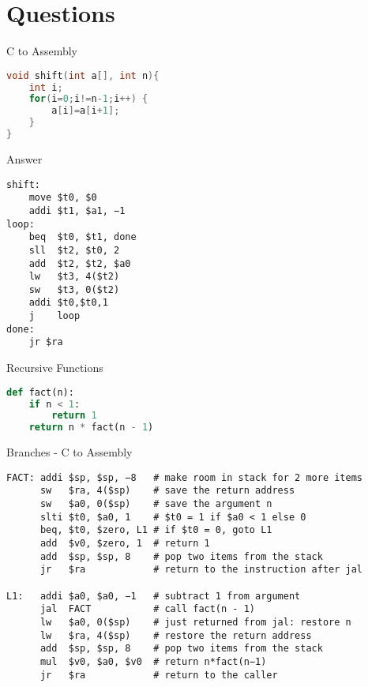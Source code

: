 \section{Questions}
\begin{frame}[fragile]{C to Assembly}
\begin{lstlisting}[language=c, keywordstyle=\color{purple}\textbf]
void shift(int a[], int n){
    int i;
    for(i=0;i!=n-1;i++) {
        a[i]=a[i+1];
    }
}
\end{lstlisting}

\end{frame}

\begin{frame}[fragile]{Answer}
\begin{lstlisting}[keywordstyle=\color{purple}\textbf, keywords={move, addi, beq, sll, add, lw, sw, j, jr}]
shift:
    move $t0, $0
    addi $t1, $a1, −1
loop:
    beq  $t0, $t1, done
    sll  $t2, $t0, 2
    add  $t2, $t2, $a0
    lw   $t3, 4($t2)
    sw   $t3, 0($t2)
    addi $t0,$t0,1
    j    loop
done:
    jr $ra
\end{lstlisting}
\end{frame}

\begin{frame}[fragile]{Recursive Functions}
\begin{lstlisting}[keywordstyle=\color{purple}\textbf, language=python]
def fact(n):
    if n < 1:
        return 1
    return n * fact(n - 1)
\end{lstlisting}    
\end{frame}

\begin{frame}[fragile]{Branches - C to Assembly}
\begin{lstlisting}[keywords={addi, sw, add, slti, beq, mul, jr, jal, lw}, keywordstyle=\color{purple}\textbf]
FACT: addi $sp, $sp, −8   # make room in stack for 2 more items
      sw   $ra, 4($sp)    # save the return address
      sw   $a0, 0($sp)    # save the argument n
      slti $t0, $a0, 1    # $t0 = 1 if $a0 < 1 else 0
      beq, $t0, $zero, L1 # if $t0 = 0, goto L1
      add  $v0, $zero, 1  # return 1
      add  $sp, $sp, 8    # pop two items from the stack
      jr   $ra            # return to the instruction after jal
    
L1:   addi $a0, $a0, −1   # subtract 1 from argument
      jal  FACT           # call fact(n - 1)
      lw   $a0, 0($sp)    # just returned from jal: restore n
      lw   $ra, 4($sp)    # restore the return address
      add  $sp, $sp, 8    # pop two items from the stack
      mul  $v0, $a0, $v0  # return n*fact(n−1)
      jr   $ra            # return to the caller
\end{lstlisting}    
\end{frame}


